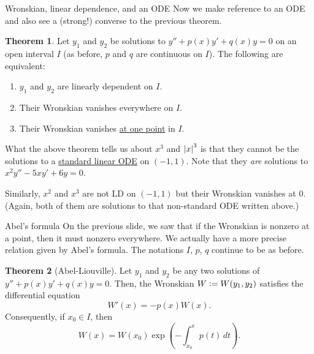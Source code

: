 \documentclass[dvipsnames, handout]{beamer}
\theoremstyle{definition}
\newtheorem{thm}{Theorem}
\begin{document}
\begin{frame}{Wronskian, linear dependence, and an ODE}
  Now we make reference to an ODE and also see a (strong!) converse to the previous theorem. \pause

  \begin{thm}
    Let $y_{1}$ and $y_{2}$ be solutions to $y'' + p(x) y' + q(x) y = 0$ on an open interval $I$ \pause (as before, $p$ and $q$ are continuous on $I$). \pause The following are equivalent: \pause
    \begin{enumerate}[<+->]
      \item $y_{1}$ and $y_{2}$ are linearly dependent on $I$.
      \item Their Wronskian vanishes everywhere on $I$.
      \item Their Wronskian vanishes \underline{at one point} in $I$.
    \end{enumerate}
  \end{thm} \pause

  What the above theorem tells us about $x^{3}$ and ${\left\lvert x \right\lvert}^{3}$ is that they cannot be the solutions to a \underline{standard linear ODE} on $(-1, 1)$. \pause Note that they \emph{are} solutions to $x^{2} y'' - 5xy' + 6y = 0$. \pause

  Similarly, $x^{2}$ and $x^{3}$ are not LD on $(-1, 1)$ but their Wronskian vanishes at $0$. \pause (Again, both of them are solutions to that non-standard ODE written above.)
\end{frame}
\begin{frame}{Abel's formula}
  On the previous slide, we saw that if the Wronskian is nonzero at a point, then it must nonzero everywhere. \pause We actually have a more precise relation given by Abel's formula. \pause The notations $I$, $p$, $q$ continue to be as before. \pause

  \begin{thm}[Abel-Liouville]
    Let $y_{1}$ and $y_{2}$ be any two solutions of $y'' + p(x) y' + q(x) y = 0$. \pause Then, the Wronskian $W \vcentcolon= W(y_{1}, y_{2})$ satisfies the differential equation \pause 
    \begin{equation*} 
      W'(x) = -p(x) W(x).
    \end{equation*}
    \pause Consequently, if $x_{0} \in I$, then
    \begin{equation*} 
      W(x) = W(x_{0}) \exp\left(-\int_{x_{0}}^{x} p(t) \,dt\right).
    \end{equation*}
  \end{thm}
\end{frame}
\end{document}
